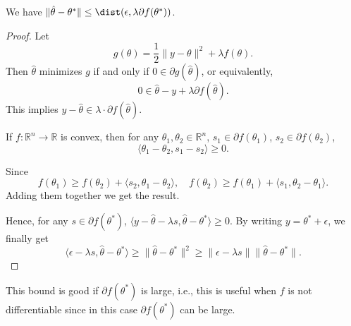 \begin{lemma}
	We have \(\lVert \hat{\theta} - \theta ^{\ast} \rVert \leq \dist(\epsilon , \lambda \partial f(\theta ^{\ast} )) \).
\end{lemma}
\begin{proof}
	Let
	\[
		g(\theta ) = \frac{1}{2} \lVert y - \theta  \rVert ^2 + \lambda f(\theta ).
	\]
	Then \(\hat{\theta} \) minimizes \(g\) if and only if \(0\in \partial g(\hat{\theta} )\), or equivalently,
	\[
		0 \in \hat{\theta} - y + \lambda \partial f(\hat{\theta} ).
	\]
	This implies \(y - \hat{\theta} \in \lambda \cdot \partial f(\hat{\theta} )\).

	\begin{claim}
		If \(f\colon \mathbb{R} ^n \to \mathbb{R} \) is convex, then for any \(\theta _1, \theta _2 \in \mathbb{R} ^n\), \(s_1 \in \partial f(\theta _1)\), \(s_2 \in \partial f(\theta _2)\),
		\[
			\langle \theta _1 - \theta _2, s_1 - s_2 \rangle \geq 0.
		\]
	\end{claim}
	\begin{explanation}
		Since
		\[
			f(\theta _1) \geq f(\theta _2) + \langle s_2, \theta _1 - \theta _2 \rangle ,\quad
			f(\theta _2) \geq f(\theta _1) + \langle s_1, \theta _2 - \theta _1 \rangle .
		\]
		Adding them together we get the result.
	\end{explanation}

	Hence, for any \(s\in \partial f(\theta ^{\ast} )\), \(\langle y - \hat{\theta} - \lambda s , \hat{\theta} - \theta ^{\ast} \rangle \geq 0\). By writing \(y = \theta ^{\ast} + \epsilon \), we finally get
	\[
		\langle \epsilon - \lambda s, \hat{\theta} - \theta ^{\ast}  \rangle \geq \lVert \hat{\theta} - \theta ^{\ast} \rVert ^2
		\geq \lVert \epsilon - \lambda s \rVert \lVert \hat{\theta} - \theta ^{\ast} \rVert.
	\]
\end{proof}

\begin{remark}
	This bound is good if \(\partial f(\theta ^{\ast} )\) is large, i.e., this is useful when \(f\) is not differentiable since in this case \(\partial f(\theta ^{\ast} )\) can be large.
\end{remark}


